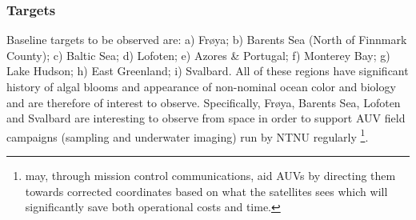 \subsubsection{Targets} \label{sec:targets}
Baseline targets to be observed are: a) Fr{\o}ya; b) Barents Sea (North of Finnmark County); c) Baltic Sea; d) Lofoten; e) Azores \& Portugal; f) Monterey Bay; g) Lake Hudson; h) East Greenland; i) Svalbard. All of these regions have significant history of algal blooms and appearance of non-nominal ocean color and biology and are therefore of interest to observe. Specifically, Fr{\o}ya, Barents Sea, Lofoten and Svalbard are interesting to observe from space in order to support AUV field campaigns (sampling and underwater imaging) run by NTNU regularly \footnote{\hypso may, through mission control communications, aid AUVs by directing them towards corrected coordinates based on what the satellites sees which will significantly save both operational costs and time.}. 

